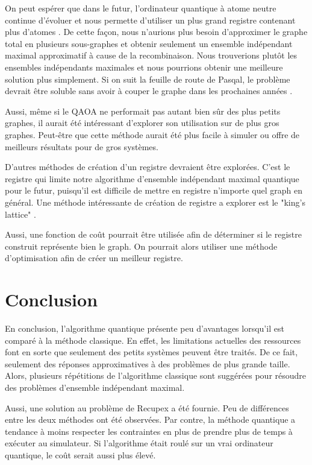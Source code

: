 \documentclass[11pt]{article}
\begin{document}
On peut espérer que dans le futur, l'ordinateur quantique à atome neutre continue d'évoluer et nous permette d'utiliser un plus grand registre contenant plus d'atomes \cite{noauthor_pasqal_nodate}. De cette façon, nous n'aurions plus besoin d'approximer le graphe total en plusieurs sous-graphes et obtenir seulement un ensemble indépendant maximal approximatif à cause de la recombinaison. Nous trouverions plutôt les ensembles indépendants maximales et nous pourrions obtenir une meilleure solution plus simplement. Si on suit la feuille de route de Pasqal, le problème devrait être soluble sans avoir à couper le graphe dans les prochaines années \cite{noauthor_our_nodate}.

Aussi, même si le QAOA ne performait pas autant bien sûr des plus petits graphes, il aurait été intéressant d'explorer son utilisation sur de plus gros graphes. Peut-être que cette méthode aurait été plus facile à simuler ou offre de meilleurs résultats pour de gros systèmes. 

D'autres méthodes de création d'un registre devraient être explorées. C'est le registre qui limite notre algorithme d'ensemble indépendant maximal quantique pour le futur, puisqu'il est difficile de mettre en registre n'importe quel graph en général. Une méthode intéressante de création de registre a explorer est le "king's lattice" \cite{kim_quantum_2023}.

Aussi, une fonction de coût pourrait être utilisée afin de déterminer si le registre construit représente bien le graph. On pourrait alors utiliser une méthode d'optimisation afin de créer un meilleur registre.


\section{Conclusion}
En conclusion, l'algorithme quantique présente peu d’avantages lorsqu'il est comparé à la méthode classique. En effet, les limitations actuelles des ressources font en sorte que seulement des petits systèmes peuvent être traités. De ce fait, seulement des réponses approximatives à des problèmes de plus grande taille. Alors, plusieurs répétitions de l'algorithme classique sont suggérées pour résoudre des problèmes d'ensemble indépendant maximal. 

Aussi, une solution au problème de Recupex a été fournie. Peu de différences entre les deux méthodes ont été observées. Par contre, la méthode quantique a tendance à moins respecter les contraintes en plus de prendre plus de temps à exécuter au simulateur. Si l'algorithme était roulé sur un vrai ordinateur quantique, le coût serait aussi plus élevé.
\end{document}
